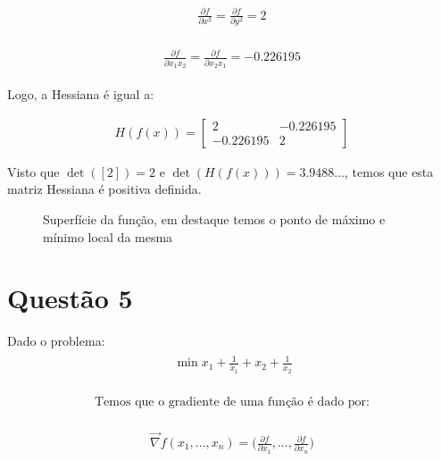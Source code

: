 \documentclass[fleqn, 11pt]{article}
\renewcommand{\min}{\expandafter\,\operatorname*{min}}
\begin{document}
\begin{align*}
\begin{split}
\frac{\partial f}{\partial x^2} = \frac{\partial f}{\partial y^2} = 2
\end{split}
\end{align*}

\begin{align*}
\begin{split}
\frac{\partial f}{\partial 	x_1 x_2} =\frac{\partial f}{\partial 	x_2 x_1} = -0.226195
\end{split}
\end{align*}

Logo, a Hessiana é igual a:

\begin{align*}
H(f(x)) =
\begin{bmatrix}
2 & -0.226195 \\ 
-0.226195 & 2
\end{bmatrix}
\end{align*}

Visto que $\det([2]) = 2$ e $\det(H(f(x))) = 3.9488...$, temos que esta matriz Hessiana é positiva definida.
\begin{figure}[H]
\label{figure:fig1}
   \caption{Superfície da função, em destaque temos o ponto de máximo e mínimo local da mesma}
\end{figure}

\newpage
\section*{Questão 5}
Dado o problema:
\begin{align*}
\begin{split}
\min x_1 + \frac{1}{x_1}+x_2+\frac{1}{x_2}
\end{split}
\end{align*}

\begin{align*}
\begin{split}
\text{Temos que o gradiente de uma função é dado por:}
\end{split}
\end{align*}

\begin{align*}
\begin{split}
\vec{\nabla} f (x_1, ..., x_n) = \biggl( \frac{\partial f}{\partial x_1}, ..., \frac{\partial f}{\partial x_n} \biggr)
\end{split}
\end{align*}
\end{document}
